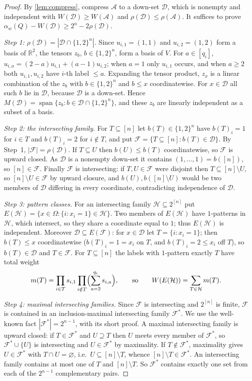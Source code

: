 \documentclass[11pt,a4paper]{article}
\theoremstyle{plain}
\theoremstyle{definition}
\theoremstyle{remark}
\newcommand{\R}{\mathbb R}
\newcommand{\cA}{\mathcal A}
\newcommand{\cD}{\mathcal D}
\newcommand{\cF}{\mathcal F}
\newcommand{\cH}{\mathcal H}
\newcommand{\Om}{\Omega}
\newcommand{\rk}{\rho}
\newcommand{\alw}{\alpha_w}
\newcommand{\spn}{\operatorname{span}}
\begin{document}
\begin{proof}
By \cref{lem:compress}, compress $\cA$ to a down-set $\cD$, which is nonempty and independent with $W(\cD)\ge W(\cA)$ and $\rk(\cD)\le\rk(\cA)$. It suffices to prove $\alw(Q)-W(\cD)\ge2^n-2\rk(\cD)$.

\emph{Step 1: $\rk(\cD)=|\cD\cap\{1,2\}^n|$.} Since $u_{i,1}=(1,1)$ and $u_{i,2}=(1,2)$ form a basis of $\R^2$, the tensors $z_b$, $b\in\{1,2\}^n$, form a basis of $V$. For $a\in[q_i]$, $u_{i,a}=(2-a)u_{i,1}+(a-1)u_{i,2}$; when $a=1$ only $u_{i,1}$ occurs, and when $a\ge2$ both $u_{i,1},u_{i,2}$ have $i$-th label $\le a$. Expanding the tensor product, $z_x$ is a linear combination of the $z_b$ with $b\in\{1,2\}^n$ and $b\le x$ coordinatewise. For $x\in\cD$ all such $b$ lie in $\cD$, because $\cD$ is a down-set. Hence $M(\cD)=\spn\{z_b:b\in\cD\cap\{1,2\}^n\}$, and these $z_b$ are linearly independent as a subset of a basis.

\emph{Step 2: the intersecting family.} For $T\subseteq[n]$ let $b(T)\in\{1,2\}^n$ have $b(T)_i=1$ for $i\in T$ and $b(T)_i=2$ for $i\notin T$, and put $\cF=\{T\subseteq[n]:b(T)\in\cD\}$. By Step~1, $|\cF|=\rk(\cD)$. If $T\subseteq U$ then $b(U)\le b(T)$ coordinatewise, so $\cF$ is upward closed. As $\cD$ is a nonempty down-set it contains $(1,\dots,1)=b([n])$, so $[n]\in\cF$. Finally $\cF$ is intersecting: if $T,U\in\cF$ were disjoint then $T\subseteq[n]\setminus U$, so $[n]\setminus U\in\cF$ by upward closure, and $b(U),b([n]\setminus U)$ would be two members of $\cD$ differing in every coordinate, contradicting independence of $\cD$.

\emph{Step 3: pattern classes.} For an intersecting family $\cH\subseteq2^{[n]}$ put $E(\cH)=\{x\in\Om:\{i:x_i=1\}\in\cH\}$. Two members of $E(\cH)$ have $1$-patterns in $\cH$, which intersect, so they share a coordinate equal to $1$; thus $E(\cH)$ is independent. Moreover $\cD\subseteq E(\cF)$: for $x\in\cD$ let $T=\{i:x_i=1\}$; then $b(T)\le x$ coordinatewise ($b(T)_i=1=x_i$ on $T$, and $b(T)_i=2\le x_i$ off $T$), so $b(T)\in\cD$ and $T\in\cF$. For $T\subseteq[n]$ the labels with $1$-pattern exactly $T$ have total weight
\[
m(T)=\prod_{i\in T}s_{i,1}\prod_{i\notin T}\Bigl(\sum_{a=2}^{q_i}s_{i,a}\Bigr),
\qquad\text{so}\qquad W(E(\cH))=\sum_{T\in\cH}m(T).
\]

\emph{Step 4: maximal intersecting families.} Since $\cF$ is intersecting and $2^{[n]}$ is finite, $\cF$ is contained in an inclusion-maximal intersecting family $\cF^*$. We use the well-known fact $|\cF^*|=2^{n-1}$, with its short proof. A maximal intersecting family is upward closed: if $T\in\cF^*$ and $U\supseteq T$ then $U$ meets every member of $\cF^*$, so $\cF^*\cup\{U\}$ is intersecting and $U\in\cF^*$ by maximality. If $T\notin\cF^*$, maximality gives $U\in\cF^*$ with $T\cap U=\varnothing$, i.e.\ $U\subseteq[n]\setminus T$, whence $[n]\setminus T\in\cF^*$. An intersecting family contains at most one of $T$ and $[n]\setminus T$. So $\cF^*$ contains exactly one set from each of the $2^{n-1}$ complementary pairs.


\end{proof}
\end{document}
